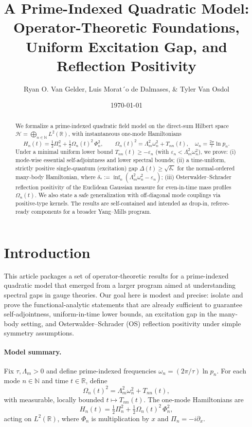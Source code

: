 \documentclass[11pt]{article}
\title{A Prime-Indexed Quadratic Model: Operator-Theoretic Foundations, Uniform Excitation Gap, and Reflection Positivity}
\author{Ryan O. Van Gelder, Luis Morat´o de Dalmases, \& Tyler Van Osdol}
\date{\today}
\theoremstyle{plain}
\theoremstyle{definition}
\theoremstyle{remark}
\newcommand{\R}{\mathbb{R}}
\newcommand{\N}{\mathbb{N}}
\newcommand{\Hcal}{\mathcal{H}}
\begin{document}
\maketitle

\begin{abstract}
We formalize a prime-indexed quadratic field model on the direct-sum Hilbert space $\Hcal=\bigoplus_{n\in\N} L^2(\R)$, with instantaneous one-mode Hamiltonians
$$
H_n(t)=\tfrac12\Pi_n^2+\tfrac12\Omega_n(t)^2\,\Phi_n^2,\qquad \Omega_n(t)^2=\Lambda_m^2\omega_n^2+T_{nn}(t),\quad \omega_n=\tfrac{2\pi}{\tau}\ln p_n.
$$
Under a minimal uniform lower bound $T_{nn}(t)\ge-\varepsilon_n$ (with $\varepsilon_n<\Lambda_m^2\omega_n^2$), we prove: (i) mode-wise essential self-adjointness and lower spectral bounds; (ii) a time-uniform, strictly positive single-quantum (excitation) gap $\Delta(t)\ge \sqrt{\delta_*}$ for the normal-ordered many-body Hamiltonian, where $\delta_*:=\inf_n(\Lambda_m^2\omega_n^2-\varepsilon_n)$; (iii) Osterwalder--Schrader reflection positivity of the Euclidean Gaussian measure for even-in-time mass profiles $\Omega_n(t)$. We also state a safe generalization with off-diagonal mode couplings via positive-type kernels. The results are self-contained and intended as drop-in, referee-ready components for a broader Yang--Mills program.
\end{abstract}

\tableofcontents

\section{Introduction}
This article packages a set of operator-theoretic results for a prime-indexed quadratic model that emerged from a larger program aimed at understanding spectral gaps in gauge theories. Our goal here is modest and precise: isolate and prove the functional-analytic statements that are already sufficient to guarantee self-adjointness, uniform-in-time lower bounds, an excitation gap in the many-body setting, and Osterwalder--Schrader (OS) reflection positivity under simple symmetry assumptions.

\paragraph{Model summary.}
Fix $\tau,\Lambda_m>0$ and define prime-indexed frequencies $\omega_n=(2\pi/\tau)\ln p_n$. For each mode $n\in\N$ and time $t\in\R$, define
\begin{equation}\label{eq:Omega}
\Omega_n(t)^2=\Lambda_m^2\omega_n^2+T_{nn}(t),
\end{equation}
with measurable, locally bounded $t\mapsto T_{nn}(t)$. The one-mode Hamiltonians are
\begin{equation}\label{eq:Hn}
H_n(t)=\tfrac12\Pi_n^2+\tfrac12\Omega_n(t)^2\,\Phi_n^2,
\end{equation}
acting on $L^2(\R)$, where $\Phi_n$ is multiplication by $x$ and $\Pi_n=-i\partial_x$.
\end{document}
